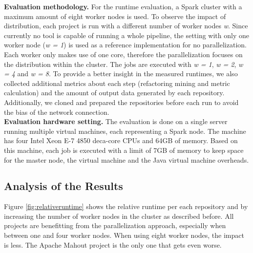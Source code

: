 \textbf{Evaluation methodology.} For the runtime evaluation, a Spark cluster with a maximum amount of eight worker nodes is used. To observe the impact of distribution, each project is run with a different number of worker nodes \emph{w}. Since currently no tool is capable of running a whole pipeline, the setting with only one worker node (\emph{w = 1}) is used as a reference implementation for no parallelization. Each worker only makes use of one core, therefore the parallelization focuses on the distribution within the cluster. The jobs are executed with \emph{w = 1}, \emph{w = 2}, \emph{w = 4} and \emph{w = 8}. To provide a better insight in the measured runtimes, we also collected additional metrics about each step (refactoring mining and metric calculation) and the amount of output data generated by each repository. Additionally, we cloned and prepared the repositories before each run to avoid the bias of the network connection.\\
\textbf{Evaluation hardware setting.} The evaluation is done on a single server running multiple virtual machines, each representing a Spark node. The machine has four Intel Xeon E-7 4850 deca-core CPUs and 64GB of memory. Based on this machine, each job is executed with a limit of 7GB of memory to keep space for the master node, the virtual machine and the Java virtual machine overheads.

\subsection{Analysis of the Results}
Figure \ref{fig:relativeruntime} shows the relative runtime per each repository and by increasing the number of worker nodes in the cluster as described before. All projects are benefitting from the parallelization approach, especially when between one and four worker nodes. When using eight worker nodes, the impact is less. The Apache Mahout project is the only one that gets even worse.

